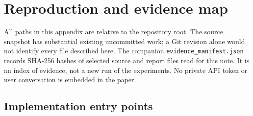 \documentclass[11pt,a4paper]{article}
\newcommand{\pathref}[1]{\nolinkurl{#1}}
\begin{document}
\appendix
\clearpage
\section{Reproduction and evidence map}

All paths in this appendix are relative to the repository root. The source
snapshot has substantial existing uncommitted work; a Git revision alone would
not identify every file described here. The companion
\pathref{evidence_manifest.json} records SHA-256 hashes of selected source and
report files read for this note. It is an index of evidence, not a new run of the
experiments. No private API token or user conversation is embedded in the paper.

\subsection{Implementation entry points}
\end{document}
